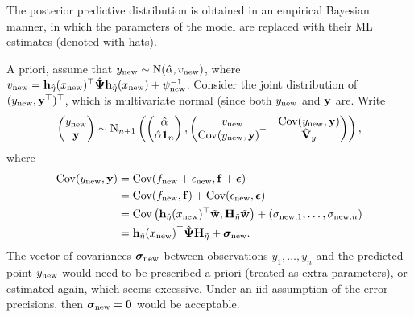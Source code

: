 The posterior predictive distribution is obtained in an empirical Bayesian manner, in which the parameters of the model are replaced with their ML estimates (denoted with hats).


A priori, assume that $y_{\text{new}} \sim \operatorname{N}(\hat\alpha, v_{\text{new}})$, where $v_{\text{new}} =  {\mathbf h}_{\hat\eta}(x_{\text{new}})^\top \hat{{\bm\Psi}} {\mathbf h}_{\hat\eta}(x_{\text{new}}) + \psi^{-1}_{\text{new}} $.
Consider the joint distribution of $(y_{\text{new}},{\mathbf y}^\top)^\top$, which is multivariate normal (since both $y_{\text{new}}$ and ${\mathbf y}$ are.
Write
\[
  \begin{pmatrix}
    y_{\text{new}} \\
    {\mathbf y}
  \end{pmatrix}
  \sim \operatorname{N}_{n+1}
  \left(
    \begin{pmatrix}
      \hat\alpha \\
      \hat\alpha{\mathbf 1}_n
    \end{pmatrix},
    \begin{pmatrix}
      v_{\text{new}} &\operatorname{Cov}(y_{\text{new}},{\mathbf y}) \\
      \operatorname{Cov}(y_{\text{new}},{\mathbf y})^\top &\tilde{{\mathbf V}}_y \\
    \end{pmatrix}
  \right),
\]
where 
\begin{align*}
  \operatorname{Cov}(y_{\text{new}},{\mathbf y})
  &= \operatorname{Cov}(f_{\text{new}} + \epsilon_{\text{new}}, {\mathbf f} + {\bm\epsilon}) \\
  &= \operatorname{Cov}(f_{\text{new}}, {\mathbf f}) + \operatorname{Cov}(\epsilon_{\text{new}}, {\bm\epsilon}) \\
  &= \operatorname{Cov}\left({\mathbf h}_{\hat\eta}(x_{\text{new}})^\top \tilde{\mathbf w},{\mathbf H}_{\tilde\eta}\tilde{\mathbf w} \right) + (\sigma_{{\text{new}},1},\dots,\sigma_{{\text{new}},n}) \\
  &= {\mathbf h}_{\hat\eta}(x_{\text{new}})^\top\hat{{\bm\Psi}}{\mathbf H}_{\tilde\eta} + {\bm\sigma}_{\text{new}}.
\end{align*}
The vector of covariances ${\bm\sigma}_{\text{new}}$ between observations $y_1,\dots,y_n$ and the predicted point $y_{\text{new}}$ would need to be prescribed a priori (treated as extra parameters), or estimated again, which seems excessive.
Under an iid assumption of the error precisions, then ${\bm\sigma}_{\text{new}} = {\mathbf 0}$ would be acceptable.

